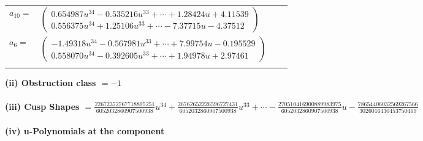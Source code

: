 \documentclass[1p]{elsarticle_modified}
\theoremstyle{definition}
\begin{document}
\begin{tabular}{m{7pt} m{180pt} m{7pt} m{180pt} }
\flushright $a_{10}=$&$\begin{pmatrix}0.654987 u^{34}-0.535216 u^{33}+\cdots+1.28424 u+4.11539\\0.556375 u^{34}+1.25106 u^{33}+\cdots-7.37715 u-4.37512\end{pmatrix}$ \\
\flushright $a_{6}=$&$\begin{pmatrix}-1.49318 u^{34}-0.567981 u^{33}+\cdots+7.99754 u-0.195529\\0.558070 u^{34}-0.392605 u^{33}+\cdots+1.94978 u+2.97461\end{pmatrix}$\\&\end{tabular}
\flushleft \textbf{(ii) Obstruction class $= -1$}\\~\\
\flushleft \textbf{(iii) Cusp Shapes $= \frac{22672372767718895251}{6052032860907500938} u^{34}+\frac{26762652226596727431}{6052032860907500938} u^{33}+\cdots-\frac{270510416900889983975}{6052032860907500938} u-\frac{78654406032569267566}{3026016430453750469}$}\\~\\
\newpage\renewcommand{\arraystretch}{1}
\flushleft \textbf{(iv) u-Polynomials at the component}\newline \\
\end{document}
